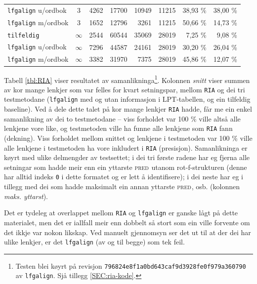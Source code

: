 \documentclass[12pt,a4paper,oneside,draft]{report}
\newcommand{\F}[2]{\textsc{#1}\ensuremath{_{#2}}}
\newcommand{\PRED}{\F{pred}{}}
\begin{document}
\begin{table}[htb]
\begin{center}
\begin{tabular}{lcrrrrrr}
 \texttt{lfgalign} u/ordbok  &              3  &   4262  &  17700  &    10949  &                 11215  &  38,93 \%           &  38,00 \%              \\
 \texttt{lfgalign} m/ordbok  &              3  &   1652  &  12796  &     3261  &                 11215  &  50,66 \%           &  14,73 \%              \\
\hline
 \texttt{tilfeldig}          &       $\infty$  &   2544  &  60544  &    35069  &                 28019  &  7,25 \%            &  9,08 \%               \\
 \texttt{lfgalign} u/ordbok  &       $\infty$  &   7296  &  44587  &    24161  &                 28019  &  30,20 \%           &  26,04 \%              \\
 \texttt{lfgalign} m/ordbok  &       $\infty$  &   3382  &  31970  &     7375  &                 28019  &  45,86 \%           &  12,07 \%              \\
\end{tabular}
\end{center}
\end{table}


Tabell \ref{tbl:RIA} viser resultatet av
 samanlikninga\footnote{Testen blei køyrt på revisjon
        \texttt{796824e8f1a0bd643caf9d3928fe0f979a360790} av \texttt{lfgalign}.  Sjå
        tillegg \ref{SEC:ria-kode}. }. Kolonnen \emph{snitt} viser summen av kor mange
 lenkjer som var felles for kvart setningspar, mellom \texttt{RIA} og dei tri
 testmetodane (\texttt{lfgalign} med og utan informasjon i LPT-tabellen, og
 ein tilfeldig baseline). Ved å dele dette talet på kor mange lenkjer
 \texttt{RIA} hadde, får me ein enkel samanlikning av dei to testmetodane --
 viss forholdet var 100 \% ville altså alle lenkjene vore like, og
 testmetoden ville ha funne alle lenkjene som \texttt{RIA} fann
 (dekning). Viss forholdet mellom snittet og lenkjene i testmetoden
 var 100 \% ville alle lenkjene i testmetoden ha vore inkludert i \texttt{RIA}
 (presisjon). Samanlikninga er køyrt med ulike delmengder av
 testsettet; i dei tri første radene har eg fjerna alle setningar som
 hadde meir enn ein yttarste \PRED{} utanom rot-f-strukturen (denne
 har alltid indeks \texttt{0} i dette formatet og er lett å identifisere); i
 dei neste har eg i tillegg med dei som hadde maksimalt ein annan
 yttarste \PRED{}, osb. (kolonnen \emph{maks. yttarst}).

Det er tydeleg at overlappet mellom \texttt{RIA} og \texttt{lfgalign} er ganske lågt
 på dette materialet, men det er iallfall meir enn dobbelt så stort
 som ein ville forvente om det ikkje var nokon likskap. Ved manuelt
 gjennomsyn ser det ut til at der dei har ulike lenkjer, er det
 \texttt{lfgalign} (av og til begge) som tek feil.
\end{document}
